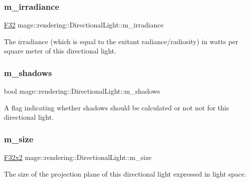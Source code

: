 \subsubsection{\texorpdfstring{m\+\_\+irradiance}{m\_irradiance}}
{\footnotesize\ttfamily \mbox{\hyperlink{namespacemage_aa97e833b45f06d60a0a9c4fc22ae02c0}{F32}} mage\+::rendering\+::\+Directional\+Light\+::m\+\_\+irradiance\hspace{0.3cm}{\ttfamily [private]}}

The irradiance (which is equal to the exitant radiance/radiosity) in watts per square meter of this directional light. \mbox{\label{classmage_1_1rendering_1_1_directional_light_a64fa40ef9f9d0ae8a0856aabd44f0cae}} 
\subsubsection{\texorpdfstring{m\+\_\+shadows}{m\_shadows}}
{\footnotesize\ttfamily bool mage\+::rendering\+::\+Directional\+Light\+::m\+\_\+shadows\hspace{0.3cm}{\ttfamily [private]}}

A flag indicating whether shadows should be calculated or not not for this directional light. \mbox{\label{classmage_1_1rendering_1_1_directional_light_ad983ca7abf8cf1f542fd68b4dfbf2ba2}} 
\subsubsection{\texorpdfstring{m\+\_\+size}{m\_size}}
{\footnotesize\ttfamily \mbox{\hyperlink{namespacemage_aee4759dedc8def6c6dec26b5c7eddf29}{F32x2}} mage\+::rendering\+::\+Directional\+Light\+::m\+\_\+size\hspace{0.3cm}{\ttfamily [private]}}

The size of the projection plane of this directional light expressed in light space. 